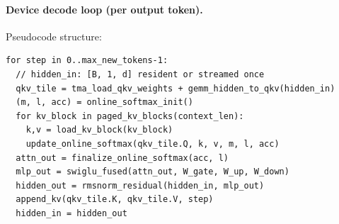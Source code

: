 \paragraph{Device decode loop (per output token).} Pseudocode structure:
\begin{verbatim}
for step in 0..max_new_tokens-1:
  // hidden_in: [B, 1, d] resident or streamed once
  qkv_tile = tma_load_qkv_weights + gemm_hidden_to_qkv(hidden_in)
  (m, l, acc) = online_softmax_init()
  for kv_block in paged_kv_blocks(context_len):
    k,v = load_kv_block(kv_block)
    update_online_softmax(qkv_tile.Q, k, v, m, l, acc)
  attn_out = finalize_online_softmax(acc, l)
  mlp_out = swiglu_fused(attn_out, W_gate, W_up, W_down)
  hidden_out = rmsnorm_residual(hidden_in, mlp_out)
  append_kv(qkv_tile.K, qkv_tile.V, step)
  hidden_in = hidden_out
\end{verbatim}

